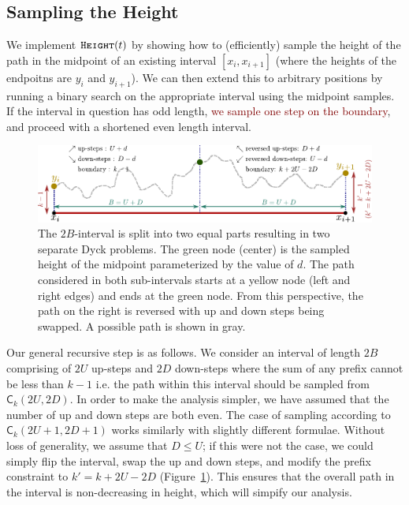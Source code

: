 \subsection{Sampling the Height}
\label{sec:sampling_the_height}
We implement $\texttt{\textsc{Height}}(t)$ by showing how to (efficiently) sample the height of the path in the midpoint of an existing interval $[x_i, x_{i+1}]$
(where the heights of the endpoitns are $y_i$ and $y_{i+1}$).
We can then extend this to arbitrary positions by running a binary search on the appropriate interval using the midpoint samples.
If the interval in question has odd length, \textcolor{Maroon}{we sample one step on the boundary}, and proceed with a shortened even length interval.
\begin{figure}[htpb]
    \centering
    \includegraphics[width=\textwidth]{images/dyck_height_sampling.pdf}
    \caption{The $2B$-interval is split into two equal parts resulting in two separate Dyck problems.
             The green node (center) is the sampled height of the midpoint parameterized by the value of $d$.
             The path considered in both sub-intervals starts at a yellow node (left and right edges) and ends at the green node.
             From this perspective, the path on the right is reversed with up and down steps being swapped.
             A possible path is shown in gray.}
    \label{fig:dyck_height_sampling}
\end{figure}

Our general recursive step is as follows.
We consider an interval of length $2B$ comprising of $2U$ up-steps and $2D$ down-steps where the sum of any prefix cannot be less than $k-1$
i.e. the path within this interval should be sampled from $\mathsf C_k(2U,2D)$.
In order to make the analysis simpler, we have assumed that the number of up and down steps are both even.
The case of sampling according to $\mathsf C_k(2U+1, 2D+1)$ works similarly with slightly different formulae.
Without loss of generality, we assume that $D\le U$; if this were not the case, we could simply flip the interval,
swap the up and down steps, and modify the prefix constraint to $k'=k+2U-2D$ (Figure~\ref{fig:dyck_height_sampling}).
This ensures that the overall path in the interval is non-decreasing in height, which will simpify our analysis.

